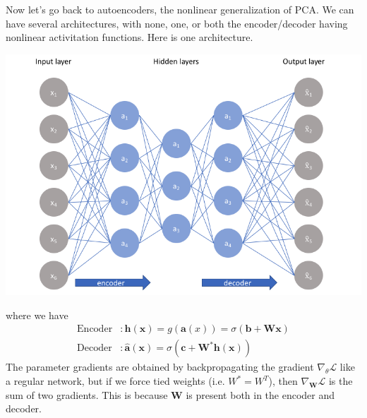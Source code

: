 \documentclass{article}
\begin{document}
    Now let's go back to autoencoders, the nonlinear generalization of PCA. We can have several architectures, with none, one, or both the encoder/decoder having nonlinear activitation functions. Here is one architecture. 
    \begin{center} 
        \includegraphics[scale=0.4]{img/05_Encoder_Decoder/autoencoder.png}
    \end{center}
    where we have 
    \begin{align*} 
        \mathrm{Encoder} & : \mathbf{h}(\mathbf{x}) = g(\mathbf{a}(x)) = \sigma (\mathbf{b} + \mathbf{W} \mathbf{x}) \\
        \mathrm{Decoder} & : \hat{\mathbf{a}}(\mathbf{x}) = \sigma (\mathbf{c} + \mathbf{W}^\ast \mathbf{h}(\mathbf{x})) 
    \end{align*} 
    The parameter gradients are obtained by backpropagating the gradient $\nabla_{\theta} \mathcal{L}$ like a regular network, but if we force tied weights (i.e. $W^\ast = W^T$), then $\nabla_{\mathbf{W}} \mathcal{L}$ is the sum of two gradients. This is because $\mathbf{W}$ is present both in the encoder and decoder. 
\end{document}
